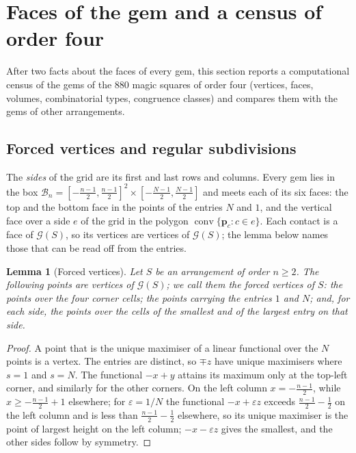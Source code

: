 \documentclass[11pt,a4paper]{article}
\theoremstyle{plain}
\newtheorem{lemma}[theorem]{Lemma}
\theoremstyle{definition}
\theoremstyle{remark}
\begin{document}
\section{Faces of the gem and a census of order four}
\label{sec:census}

After two facts about the faces of every gem, this section reports a computational census of the gems of the $880$ magic squares of order four (vertices, faces, volumes, combinatorial types, congruence classes) and compares them with the gems of other arrangements.

\subsection{Forced vertices and regular subdivisions}
\label{sec:forced}

The \emph{sides} of the grid are its first and last rows and columns.
Every gem lies in the box $\mathcal B_n=[-\frac{n-1}2,\frac{n-1}2]^2\times[-\frac{N-1}2,\frac{N-1}2]$ and meets each of its six faces: the top and the bottom face in the points of the entries $N$ and $1$, and the vertical face over a side $e$ of the grid in the polygon $\operatorname{conv}\{\mathbf p_c: c\in e\}$.
Each contact is a face of $\mathcal G(S)$, so its vertices are vertices of $\mathcal G(S)$; the lemma below names those that can be read off from the entries.

\begin{lemma}[Forced vertices]
\label{lem:forced}
Let $S$ be an arrangement of order $n\ge2$. The following points are vertices of $\mathcal G(S)$; we call them the \emph{forced vertices} of $S$: the points over the four corner cells; the points carrying the entries $1$ and $N$; and, for each side, the points over the cells of the smallest and of the largest entry on that side.
\end{lemma}

\begin{proof}
A point that is the unique maximiser of a linear functional over the $N$ points is a vertex.
The entries are distinct, so $\mp z$ have unique maximisers where $s=1$ and $s=N$.
The functional $-x+y$ attains its maximum only at the top-left corner, and similarly for the other corners.
On the left column $x=-\frac{n-1}2$, while $x\ge-\frac{n-1}2+1$ elsewhere; for $\varepsilon=1/N$ the functional $-x+\varepsilon z$ exceeds $\frac{n-1}2-\frac12$ on the left column and is less than $\frac{n-1}2-\frac12$ elsewhere, so its unique maximiser is the point of largest height on the left column; $-x-\varepsilon z$ gives the smallest, and the other sides follow by symmetry.
\end{proof}
\end{document}
